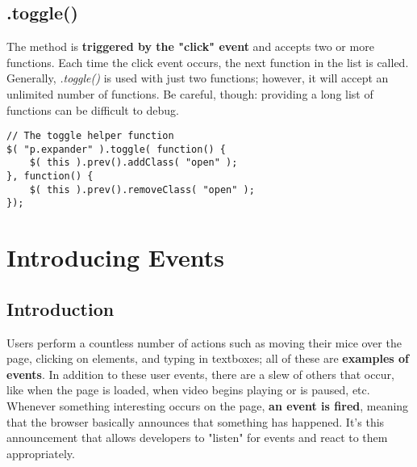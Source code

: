 \documentclass[10pt,letterpaper]{report}
\begin{document}
\subsection{.toggle()}
The method is \textbf{triggered by the "click" event} and accepts two or more functions. Each time the click event occurs, the next function in the list is called. Generally, \textit{.toggle()} is used with just two functions; however, it will accept an unlimited number of functions. Be careful, though: providing a long list of functions can be difficult to debug.
\begin{lstlisting}
// The toggle helper function
$( "p.expander" ).toggle( function() {
	$( this ).prev().addClass( "open" );
}, function() {
	$( this ).prev().removeClass( "open" );
});
\end{lstlisting}
\section{Introducing Events}
\subsection{Introduction}
Users perform a countless number of actions such as moving their mice over the page, clicking on elements, and typing in textboxes; all of these are \textbf{examples of events}. In addition to these user events, there are a slew of others that occur, like when the page is loaded, when video begins playing or is paused, etc. Whenever something interesting occurs on the page, \textbf{an event is fired}, meaning that the browser basically announces that something has happened. It's this announcement that allows developers to "listen" for events and react to them appropriately.
\end{document}
